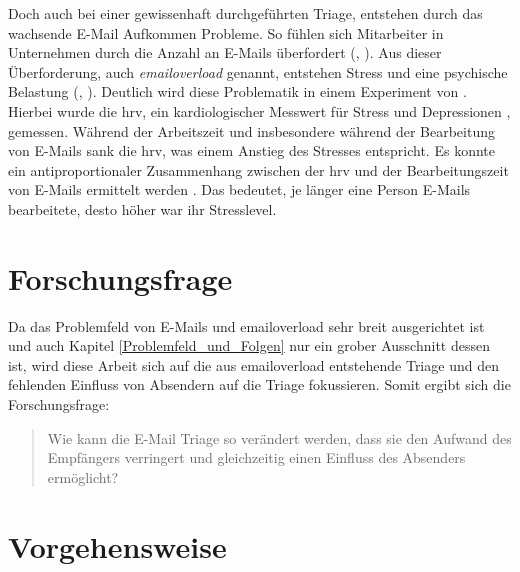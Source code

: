Doch auch bei einer gewissenhaft durchgeführten Triage, entstehen durch das wachsende E-Mail Aufkommen Probleme. So fühlen sich Mitarbeiter in Unternehmen durch die Anzahl an E-Mails überfordert (\cite[S. 179]{Dawley2003}, \cite[S. 264 f.]{Thomas2006}). Aus dieser Überforderung, auch \emph{\gls{emailoverload}} genannt, entstehen Stress und eine psychische Belastung (\cite[S. 117]{Lagrana2016}, \cite[S. 331]{Eppler2004}). Deutlich wird diese Problematik in einem Experiment von \cite{Mark2016}. Hierbei wurde die \acrfull{hrv}, ein kardiologischer Messwert für Stress und Depressionen \citep[S. 881]{Vrijkotte2000}, gemessen. Während der Arbeitszeit und insbesondere während der Bearbeitung von E-Mails sank die \acrshort{hrv}, was einem Anstieg des Stresses entspricht. Es konnte ein antiproportionaler Zusammenhang zwischen der \acrshort{hrv} und der Bearbeitungszeit von E-Mails ermittelt werden \citep[S. 1724]{Mark2016}. Das bedeutet, je länger eine Person E-Mails bearbeitete, desto höher war ihr Stresslevel. 



\section{Forschungsfrage}

Da das Problemfeld von E-Mails und \gls{emailoverload} sehr breit ausgerichtet ist und auch Kapitel \ref{Problemfeld_und_Folgen} nur ein grober Ausschnitt dessen ist, wird diese Arbeit sich auf die aus \gls{emailoverload} entstehende Triage und den fehlenden Einfluss von Absendern auf die Triage fokussieren. Somit ergibt sich die Forschungsfrage: 

\begin{quotation}
	\noindent Wie kann die E-Mail Triage so verändert werden, dass sie den Aufwand des Empfängers verringert und gleichzeitig einen Einfluss des Absenders ermöglicht?
\end{quotation}


\section{Vorgehensweise}
\label{Vorgehensweise}


